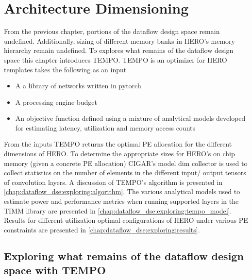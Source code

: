 \chapter{Architecture Dimensioning}
\label{chap:arch_dimensioning}

From the previous chapter, portions of the dataflow design space remain
undefined. Additionally, sizing of different memory banks in HERO's memory
hierarchy remain undefined. To explores what remains of the dataflow design
space this chapter introduces TEMPO. TEMPO is an optimizer for HERO templates
takes the following as an input 
\begin{itemize}
    \item A a library of networks written in pytorch
    \item A processing engine budget
    \item An objective function defined using a mixture of analytical models
    developed for estimating latency, utilization and memory access counts
\end{itemize}
From the inputs TEMPO returns the optimal PE allocation for the different
dimensions of HERO. To determine the appropriate sizes for HERO's on chip memory
(given a concrete PE allocation) CIGAR's model dim collector is used to collect
statistics on the number of elements in the different input/ output tensors of
convolution layers.  
A discussion of TEMPO's algorithm is presented in
\autoref{chap:dataflow_dse:exploring:algorithm}. The various analytical models
used to estimate power and performance metrics when running supported layers in
the TIMM library are presented in
\autoref{chap:dataflow_dse:exploring:tempo_model}. Results for different
utilization optimal configurations of HERO under various PE constraints are
presented in \autoref{chap:dataflow_dse:exploring:results}.  

\section{Exploring what remains of the dataflow design space with TEMPO}
\label{chap:dataflow_dse:exploring}


